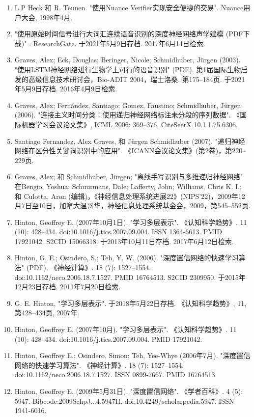 \begin{enumerate}
\item L.P Heck 和 R. Teunen. "使用Nuance Verifier实现安全便捷的交易". Nuance用户大会, 1998年4月.
\item "使用原始时间信号进行大词汇连续语音识别的深度神经网络声学建模 (PDF下载)" . ResearchGate. 于2021年5月9日存档. 2017年6月14日检索.
\item Graves, Alex; Eck, Douglas; Beringer, Nicole; Schmidhuber, Jürgen (2003). "使用LSTM神经网络进行生物学上可行的语音识别" (PDF). 第1届国际生物启发的高级信息技术研讨会，Bio-ADIT 2004，瑞士洛桑. 第175–184页. 于2021年5月9日存档. 2016年4月9日检索.
\item Graves, Alex; Fernández, Santiago; Gomez, Faustino; Schmidhuber, Jürgen (2006). "连接主义时间分类：使用递归神经网络标注未分段的序列数据". 《国际机器学习会议论文集》, ICML 2006: 369–376. CiteSeerX 10.1.1.75.6306.
\item Santiago Fernandez, Alex Graves, 和 Jürgen Schmidhuber (2007). "递归神经网络在区分性关键词识别中的应用". 《ICANN会议论文集》(第2卷)，第220–229页.
\item Graves, Alex; 和 Schmidhuber, Jürgen; "离线手写识别与多维递归神经网络" 在Bengio, Yoshua; Schuurmans, Dale; Lafferty, John; Williams, Chris K. I.; 和 Culotta, Aron (编辑)，《神经信息处理系统进展22》(NIPS'22)，2009年12月7日至10日，加拿大温哥华，神经信息处理系统基金会，2009，第545–552页.
\item Hinton, Geoffrey E. (2007年10月1日). "学习多层表示". 《认知科学趋势》. 11 (10): 428–434. doi:10.1016/j.tics.2007.09.004. ISSN 1364-6613. PMID 17921042. S2CID 15066318. 于2013年10月11日存档. 2017年6月12日检索.
\item Hinton, G. E.; Osindero, S.; Teh, Y. W. (2006). "深度置信网络的快速学习算法" (PDF). 《神经计算》. 18 (7): 1527–1554. doi:10.1162/neco.2006.18.7.1527. PMID 16764513. S2CID 2309950. 于2015年12月23日存档. 2011年7月20日检索.
\item G. E. Hinton, "学习多层表示". 于2018年5月22日存档. 《认知科学趋势》, 11, 第428–434页, 2007年.
\item Hinton, Geoffrey E. (2007年10月). "学习多层表示". 《认知科学趋势》. 11 (10): 428–434. doi:10.1016/j.tics.2007.09.004. PMID 17921042.
\item Hinton, Geoffrey E.; Osindero, Simon; Teh, Yee-Whye (2006年7月). "深度置信网络的快速学习算法". 《神经计算》. 18 (7): 1527–1554. doi:10.1162/neco.2006.18.7.1527. ISSN 0899-7667. PMID 16764513.
\item Hinton, Geoffrey E. (2009年5月31日). "深度置信网络". 《学者百科》. 4 (5): 5947. Bibcode:2009SchpJ...4.5947H. doi:10.4249/scholarpedia.5947. ISSN 1941-6016.

\end{enumerate}

